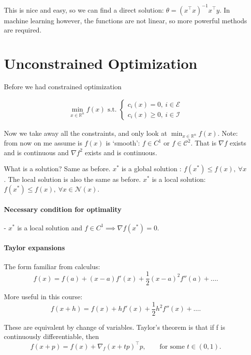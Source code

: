 \documentclass{article}
\begin{document}
This is nice and easy, so we can find a direct solution: $\theta = (x^{\top} x)^{-1}x^{\top}y$. In machine learning however, the functions are not linear, so more powerful methods are required.

\section{Unconstrained Optimization}

Before we had constrained optimization

\begin{align*}
  \min_{x \in \mathbb{R}^{n}} f(x) \text{ s.t. } \left\{
  \begin{aligned}
    c_i(x) = 0,\ i \in \mathcal{E} \\
    c_i(x) \geq 0,\  i  \in\mathcal{I}
  \end{aligned}
  \right.
\end{align*}

Now we take away all the constraints, and only look at $\min_{x \in \mathbb{R}^{n}} f(x)$. Note: from now on me assume is $f(x)$ is `smooth': $f \in C^{1}$ or $f \in \mathcal{C}^{2}$. That is
$\nabla f$ exists and is continuous and $\nabla f^2$ exists and is continuous.

What is a solution? Same as before. $x^*$ is a global solution : $f(x^*) \leq f(x),\  \forall x$.
The local solution is also the same as before. $x^*$ is a local solution: $f(x^*) \leq f(x),\  \forall x  \in\mathcal{N}(x)$.

\paragraph{Necessary condition for optimality}- $x^*$ is a local solution and $f \in C^{1} \implies \nabla f(x^*) = 0$.

\paragraph{Taylor expansions}

The form familiar from calculus:
\[
  f(x) = f(a) + (x - a)f'(x) + \frac{1}{2}(x - a)^2 f''(a) + \dots
  .\]

More useful in this course:
\[
  f(x + h) = f(x) + hf'(x) + \frac{1}{2}h^2 f''(x) + \dots
  .\]

These are equivalent by change of variables. Taylor's theorem is that if f is continuously differentiable, then
\[
  f(x+p) = f(x) + \nabla_{f}(x+tp)^{\top}p,\qquad\text{for some }t \in (0, 1)
  .\]
\end{document}

